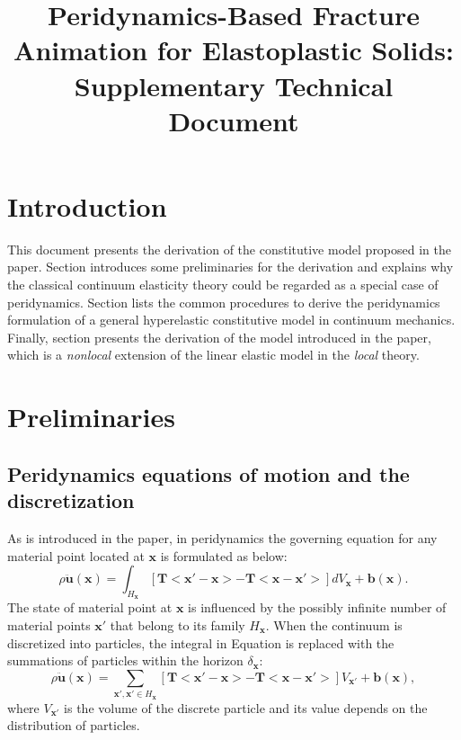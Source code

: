 \documentclass[11pt,fullpage]{article}
\title{Peridynamics-Based Fracture Animation for Elastoplastic Solids:\\
      Supplementary Technical Document}
\newcommand{\mb}[1]{\mathbf{#1}}
\newcommand{\blue}[1]{{\color{blue}{{#1}}}}
\begin{document}
\maketitle

\section{Introduction}

This document presents the derivation of the constitutive model proposed in the paper. Section \blue{\ref{section:2}} introduces some preliminaries for the derivation and explains why the classical continuum elasticity theory could be regarded as a special case of peridynamics. Section \blue{\ref{section:3}} lists the common procedures to derive the peridynamics formulation of a general hyperelastic constitutive model in continuum mechanics. Finally, section \blue{\ref{section:4}} presents the derivation of the model introduced in the paper, which is a \emph{nonlocal} extension of the linear elastic model in the \emph{local} theory.

\section{Preliminaries}\label{section:2}

\subsection{Peridynamics equations of motion and the discretization}

As is introduced in the paper, in peridynamics the governing equation for any material point located at $\mb{x}$ is formulated as below:
\begin{equation}
\rho\ddot{\mb{u}}(\mb{x}) = \int_{H_\mb{x}}[\mb{T}<\mb{x}'-\mb{x}> - \mb{T}<\mb{x}-\mb{x}'>]dV_{\mb{x}}+\mb{b}(\mb{x}).
\label{eq:1}
\end{equation}
The state of material point at $\mb{x}$ is influenced by the possibly infinite number of material points $\mb{x}'$ that belong to its family $H_\mb{x}$. When the continuum is discretized into particles, the integral in Equation \blue{\ref{eq:1}} is replaced with the summations of particles within the horizon $\delta_\mb{x}$:
\begin{equation}
\rho\ddot{\mb{u}}(\mb{x}) = \sum_{\mb{x}',\mb{x}'\in H_\mb{x}}[\mb{T}<\mb{x}'-\mb{x}> - \mb{T}<\mb{x}-\mb{x}'>]V_{\mb{x}'}+\mb{b}(\mb{x}),
\label{eq:2}
\end{equation}
where $V_{\mb{x}'}$ is the volume of the discrete particle and its value depends on the distribution of particles.
\end{document}
